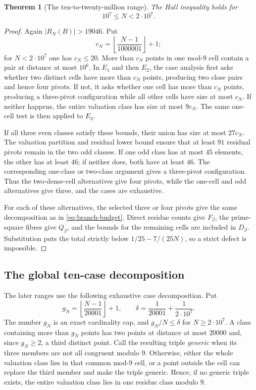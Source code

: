 \documentclass[11pt]{article}
\newtheorem{theorem}{Theorem}[section]
\theoremstyle{definition}
\newcommand{\RN}{R_N}
\newcommand{\TenMillion}{10^7}
\newcommand{\TwentyMillion}{2\cdot10^7}
\begin{document}
\begin{theorem}[The ten-to-twenty-million range]
\label{prop:ten-million-interval-close}
The Hall inequality holds for
\[
 \TenMillion\leq N<\TwentyMillion.
\]
\end{theorem}

\begin{proof}
Again $|\RN(B)|>19046$.  Put
\[
 c_N=\left\lfloor\frac{N-1}{1000001}\right\rfloor+1;
\]
for $N<\TwentyMillion$ one has $c_N\leq20$.  More than $c_N$ points in one
mod-$9$ cell contain a pair at distance at most $10^6$.  In $E_1$ and then
$E_2$, the case analysis first asks whether two distinct cells have more than
$c_N$ points, producing two close pairs and hence four pivots.  If not, it
asks whether one cell has more than $c_N$ points, producing a three-pivot
configuration while all other cells have size at most $c_N$.  If neither
happens, the entire valuation class has size at most $9c_N$.  The same
one-cell test is then applied to $E_3$.

 If all three even classes satisfy these bounds, their union has size at most
$27c_N$.  The valuation partition and residual lower bound ensure that at least $91$ residual pivots remain in the two odd classes.  If one odd class
has at most $45$ elements, the other has at least $46$; if neither does, both
 have at least $46$.  The corresponding one-class or two-class argument gives
a three-pivot configuration.  Thus the two-dense-cell alternatives give four
pivots, while the one-cell and odd alternatives give three, and the cases are
exhaustive.

For each of these alternatives, the selected three or four pivots give the
same decomposition as in \eqref{eq:branch-budget}.  Direct residue
 counts give $F_\beta$, the prime-square fibres give $Q_\beta$, and the bounds
 for the remaining cells are included in $D_\beta$.  Substitution puts the total
strictly below $1/25-7/(25N)$, so a strict defect is impossible.
\end{proof}

\subsection{The global ten-case decomposition}

The later ranges use the following exhaustive case decomposition.  Put
\[
 g_N=\left\lfloor\frac{N-1}{20001}\right\rfloor+1,
 \qquad
 \delta=\frac1{20001}+\frac1{\TwentyMillion}.
\]
The number $g_N$ is an exact cardinality cap, and
$g_N/N\leq\delta$ for $N\geq\TwentyMillion$.  A class containing more than
$g_N$ points has two points at distance at most $20000$ and, since
$g_N\geq2$, a third distinct point.  Call the resulting triple
\emph{generic} when its three members are not all congruent modulo $9$.
Otherwise, either the whole valuation class lies in that common mod-$9$ cell,
or a point outside the cell can replace the third member and make the triple
 generic.  Hence, if no generic triple exists, the entire valuation class lies
 in one residue class modulo $9$.
\end{document}
